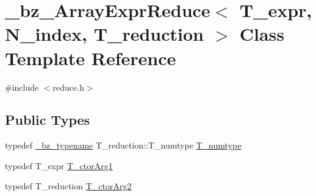 \hypertarget{class__bz__ArrayExprReduce}{}\section{\+\_\+bz\+\_\+\+Array\+Expr\+Reduce$<$ T\+\_\+expr, N\+\_\+index, T\+\_\+reduction $>$ Class Template Reference}
\label{class__bz__ArrayExprReduce}


{\ttfamily \#include $<$reduce.\+h$>$}

\subsection*{Public Types}
\begin{DoxyCompactItemize}
\item 
typedef \hyperlink{compiler_8h_a1bc40add3e72effc9cf69dbe445cbdfd}{\+\_\+bz\+\_\+typename} T\+\_\+reduction\+::\+T\+\_\+numtype \hyperlink{class__bz__ArrayExprReduce_a3ddc92b95f8b98391d5e09769317f1dc}{T\+\_\+numtype}
\item 
typedef T\+\_\+expr \hyperlink{class__bz__ArrayExprReduce_aadb6125754e2d1f858a1e5e0782ab595}{T\+\_\+ctor\+Arg1}
\item 
typedef T\+\_\+reduction \hyperlink{class__bz__ArrayExprReduce_abe71b6ef29a457006514a12efbff3e9f}{T\+\_\+ctor\+Arg2}
\end{DoxyCompactItemize}
